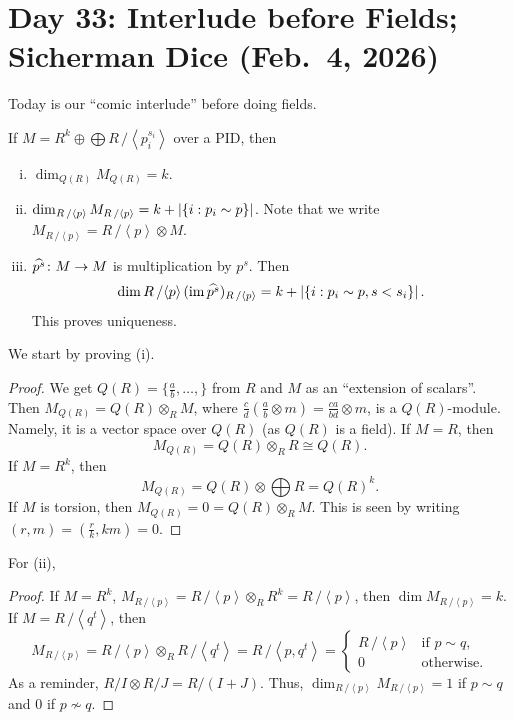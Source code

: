 \section{Day 33: Interlude before Fields; Sicherman Dice (Feb.\ 4, 2026)}
Today is our ``comic interlude'' before doing fields.
\begin{proposition}
    If $M = R^k \oplus \bigoplus R\,/\!\left<p_i^{s_i}\right>$ over a PID, then
    \begin{enumerate}[(i)]
        \item $\dim_{Q(R)} M_{Q(R)} = k$.
        \item $\dim_{R\,/\left<p\right>} M_{R\,/\left<p\right>} = k + \left\lvert \{i : p_i \sim p\} \right\rvert$. Note that we write $M_{R\,/\left<p\right>} = R\,/\!\left<p\right> \otimes M$.
        \item $\widehat{p^s} \colon M \to M$ is multiplication by $p^s$. Then
        \[ \dim R\,/\!\left<p\right> (\operatorname{im} \widehat{p^s})_{R\,/\left<p\right>} = k + \left\lvert \{i : p_i \sim p, s < s_i\} \right\rvert. \]
        This proves uniqueness.
    \end{enumerate}
\end{proposition}
We start by proving (i).
\begin{proof}
    We get $Q(R) = \{\frac{a}{b}, \dots, \}$ from $R$ and $M$ as an ``extension of scalars''. Then $M_{Q(R)} = Q(R) \otimes_R M$, where $\frac{c}{d} (\frac{a}{b} \otimes m) = \frac{ca}{bd} \otimes m$, is a $Q(R)$-module. Namely, it is a vector space over $Q(R)$ (as $Q(R)$ is a field). If $M = R$, then
    \[ M_{Q(R)} = Q(R) \otimes_R R \cong Q(R). \]
    If $M = R^k$, then
    \[ M_{Q(R)} = Q(R) \otimes \bigoplus R = Q(R)^k. \]
    If $M$ is torsion, then $M_{Q(R)} = 0 = Q(R) \otimes_R M$. This is seen by writing $(r, m) = (\frac{r}{k}, km) = 0$.
\end{proof}
For (ii),
\begin{proof}
    If $M = R^k$, $M_{R\,/\left<p\right>} = R\,/\!\left<p\right> \otimes_R R^k = R\,/\!\left<p\right>$, then $\dim M_{R\,/\left<p\right>} = k$. If $M = R\,/\!\left<q^t\right>$, then
    \[ M_{R\,/\left<p\right>} = R\,/\!\left<p\right> \otimes_R R\,/\!\left<q^t\right> = R\,/\!\left<p, q^t\right> = \begin{cases} R\,/\!\left<p\right> & \text{if $p \sim q$}, \\ 0 & \text{otherwise.} \end{cases} \]
    As a reminder, $R/I \otimes R/J = R/(I + J)$. Thus, $\dim_{R\,/\left<p\right>} M_{R\,/\left<p\right>} = 1$ if $p \sim q$ and $0$ if $p \not\sim q$.
\end{proof}
